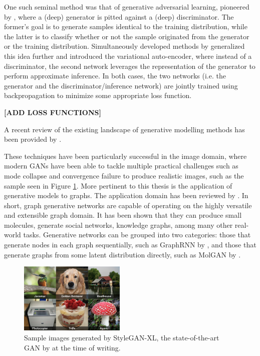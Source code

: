 One such seminal method was that of generative adversarial learning, pioneered
by \citet{goodfellow2014generative}, where a (deep) generator is pitted against
a (deep) discriminator. The former's goal is to generate samples identical to
the training distribution, while the latter is to classify whether or not the
sample originated from the generator or the training distribution.
Simultaneously developed methods by \citet{kingma2013auto} generalized this idea
further and introduced the variational auto-encoder, where instead of a
discriminator, the second network leverages the representation of the generator
to perform approximate inference. In both cases, the two networks (i.e. the
generator and the discriminator/inference network) are jointly trained using
backpropagation to minimize some appropriate loss function.

\textbf{[ADD LOSS FUNCTIONS]}

A recent review of the existing landscape of generative modelling methods has
been provided by \citet{bond2021deep}.

These techniques have been particularly successful in the image domain, where
modern GANs have been able to tackle multiple practical challenges such as mode
collapse and convergence failure to produce realistic images, such as the sample
seen in Figure \ref{fig:styleganxl}. More pertinent to this thesis is the
application of generative models to graphs. The application domain has been
reviewed by \citet{zhou2020graph}. In short, graph generative networks are
capable of operating on the highly versatile and extensible graph domain. It has
been shown that they can produce small molecules, generate social networks,
knowledge graphs, among many other real-world tasks. Generative networks can be
grouped into two categories: those that generate nodes in each graph
sequentially, such as GraphRNN by \cite{you2018graphrnn}, and those that generate
graphs from some latent distribution directly, such as MolGAN by
\cite{de2018molgan}.

\begin{figure}
  \centering
  \includegraphics[width=0.45\textwidth]{./figures/representative_image.jpg}
  \caption{Sample images generated by StyleGAN-XL, the state-of-the-art GAN
by \citet{sauer2022stylegan} at the time of writing.}
  \label{fig:styleganxl}
\end{figure}

